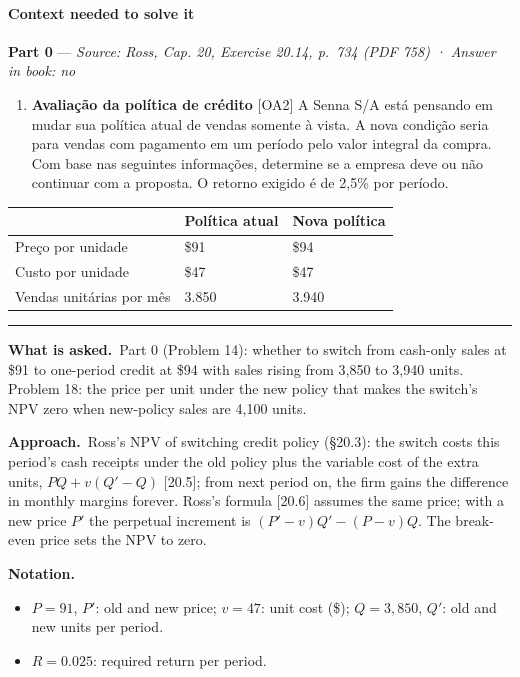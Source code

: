 \documentclass[11pt,a4paper]{article}
\newcommand{\notation}{\par\noindent\textbf{Notation.}}
\newcommand{\asked}{\par\medskip\noindent\textbf{What is asked.}~}
\newcommand{\approach}{\par\smallskip\noindent\textbf{Approach.}~}
\providecommand{\tightlist}{\setlength{\itemsep}{0pt}\setlength{\parskip}{0pt}}
\newcommand{\stmtend}{\par\endgroup\nopagebreak\noindent\rule{\linewidth}{0.4pt}\par\medskip}
\begin{document}
\paragraph{Context needed to solve it}

\textbf{Part 0} --- \emph{Source: Ross, Cap. 20, Exercise 20.14, p.~734 (PDF 758) · Answer in book:
no}

\begin{enumerate}
\def\labelenumi{\arabic{enumi}.}
\setcounter{enumi}{13}
\tightlist
\item
  \textbf{Avaliação da política de crédito} {[}OA2{]} A Senna S/A está pensando em mudar sua
  política atual de vendas somente à vista. A nova condição seria para vendas com pagamento em um
  período pelo valor integral da compra. Com base nas seguintes informações, determine se a empresa
  deve ou não continuar com a proposta. O retorno exigido é de 2,5\% por período.
\end{enumerate}

{\def\LTcaptype{none} %
\begin{longtable}[]{@{}lll@{}}
\toprule\noalign{}
& Política atual & Nova política \\
\midrule\noalign{}
\endhead
\bottomrule\noalign{}
\endlastfoot
Preço por unidade & \$91 & \$94 \\
Custo por unidade & \$47 & \$47 \\
Vendas unitárias por mês & 3.850 & 3.940 \\
\end{longtable}
}
\stmtend

\asked Part 0 (Problem 14): whether to switch from cash-only sales at \$91 to one-period credit
at \$94 with sales rising from 3{,}850 to 3{,}940 units. Problem 18: the price per unit under the
new policy that makes the switch's NPV zero when new-policy sales are 4{,}100 units.

\approach Ross's NPV of switching credit policy (\S20.3): the switch costs this period's cash
receipts under the old policy plus the variable cost of the extra units, $PQ + v(Q' - Q)$ [20.5];
from next period on, the firm gains the difference in monthly margins forever. Ross's formula
[20.6] assumes the same price; with a new price $P'$ the perpetual increment is
$(P'-v)Q' - (P - v)Q$. The break-even price sets the NPV to zero.

\notation
\begin{itemize}
  \item $P = 91$, $P'$: old and new price; $v = 47$: unit cost (\$); $Q = 3{,}850$, $Q'$: old and new units per period.
  \item $R = 0.025$: required return per period.
\end{itemize}
\end{document}

